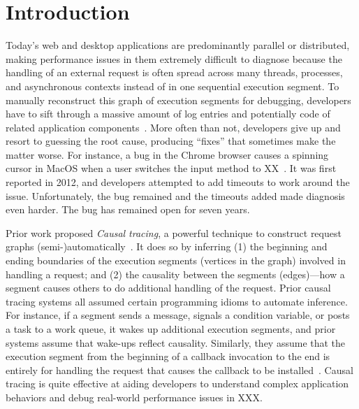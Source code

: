 \section{Introduction} \label{sec:intro}
%

%

Today's web and desktop applications are predominantly parallel or
distributed, making performance issues in them extremely difficult to
diagnose because the handling of an external request is often spread
across many threads, processes, and asynchronous
contexts
instead of in one
sequential execution segment.  To manually reconstruct this graph of
execution segments for debugging, developers have to sift through a
massive amount of log entries and potentially code of related application
components~\cite{luXXXXX}.  More often than not, developers give up and resort to
guessing the root cause, producing ``fixes'' that sometimes make the matter
worse.  For instance, a bug in the Chrome browser causes a spinning cursor
in MacOS when a user switches the input method to XX~\cite{bug-url}.  It
was first reported in 2012, and developers attempted to add timeouts
to work around the issue.  Unfortunately, the bug remained and the timeouts
added made diagnosis even harder.  The bug has remained open for seven years.

Prior work proposed \emph{Causal tracing}, a powerful technique to
construct request graphs (semi-)automatically~\cite{xxx}. It does so by
inferring (1) the beginning and ending boundaries of the execution
segments (vertices in the graph) involved in handling a request; and (2)
the causality between the segments (edges)---how a segment causes others
to do additional handling of the request.  Prior causal tracing systems
all assumed certain programming idioms to automate inference.  For
instance, if a segment sends a message, signals a condition variable, or
posts a task to a work queue, it wakes up additional execution segments,
and prior systems assume that wake-ups reflect causality.  Similarly, they
assume that the execution segment from the beginning of a callback
invocation to the end is entirely for handling the request that causes the
callback to be installed~\cite{}.  Causal tracing is quite effective at
aiding developers to understand complex application behaviors and debug
real-world performance issues in XXX.

